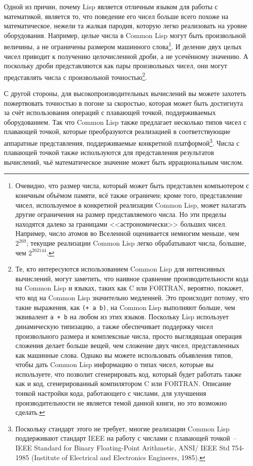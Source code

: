 Одной из причин, почему Lisp является отличным языком для работы с математикой, является
то, что поведение его чисел больше всего похоже на математическое, нежели та жалкая
пародия, которую легко реализовать на уровне оборудования.  Например, целые числа в Common
Lisp могут быть произвольной величины, а не ограничены размером машинного
слова\footnote{Очевидно, что размер числа, который может быть представлен компьютером с
  конечным объёмом памяти, всё также ограничен; кроме того, представление чисел,
  используемое в конкретной реализации Common Lisp, может налагать другие ограничения на
  размер представляемого числа.  Но эти пределы находятся далеко за границами
  <<астрономически>> больших чисел.  Например, число атомов во Вселенной оценивается
  немногим меньше, чем $2^{269}$; текущие реализации Common Lisp легко обрабатывают числа,
  большие, чем $2^{262144}$.}.  И деление двух целых чисел приводит к получению
целочисленной дроби, а не усечённому значению.  А поскольку дроби представляются как пары
произвольных чисел, они могут представлять числа с произвольной точностью\footnote{Те,
  кто интересуются использованием Common Lisp для интенсивных вычислений, могут заметить,
  что наивное сравнение производительности кода на Common Lisp и языках, таких как C или
  FORTRAN, вероятно, покажет, что код на Common Lisp значительно медленней.  Это происходит
  потому, что такие выражения, как \lstinline{(+ a b)}, на Common Lisp выполняют больше, чем
  эквивалент \lstinline{a + b} на любом из этих языков.  Поскольку Lisp использует динамическую
  типизацию, а также обеспечивает поддержку чисел произвольного размера и комплексные
  числа, просто выглядящаая операция сложения делает больше вещей, чем сложение двух
  чисел, представленных как машинные слова.  Однако вы можете использовать объявления
  типов, чтобы дать Common Lisp информацию о типах чисел, которые вы используете, что
  позволит сгенерировать код, который будет работать также как и код, сгенерированный
  компилятором C или FORTRAN.  Описание тонкой настройки кода, работающего с числами, для
  улучшения производительности не является темой данной книги, но это возможно сделать.}.

С другой стороны, для высокопроизводительных вычислений вы можете захотеть пожертвовать
точностью в погоне за скоростью, которая может быть достигнута за счёт использования
операций с плавающей точкой, поддерживаемых оборудованием.  Так что Common Lisp также
предлагает несколько типов чисел с плавающей точкой, которые преобразуются реализацией в
соответствующие аппаратные представления, поддерживаемые конкретной
платформой\footnote{Поскольку стандарт этого не требует, многие реализации Common Lisp
  поддерживают стандарт IEEE на работу с числами с плавающей точкой~-- IEEE Standard for
  Binary Floating-Point Arithmetic, ANSI/ IEEE Std 754-1985 (Institute of Electrical and
  Electronics Engineers, 1985).}.  Числа с плавающей точкой также используются для
представления результатов вычислений, чьё математическое значение может быть
иррациональным числом.


